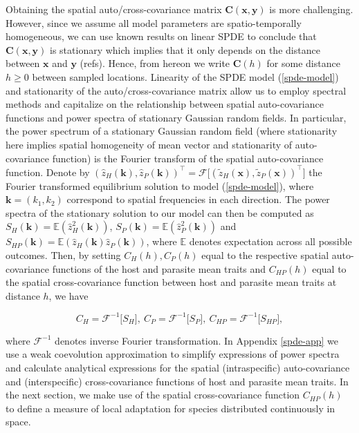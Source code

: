 \documentclass{article}
\begin{document}
Obtaining the spatial auto/cross-covariance matrix
\(\pmb C(\pmb x,\pmb y)\) is more challenging. However, since we assume
all model parameters are spatio-temporally homogeneous, we can use known
results on linear SPDE to conclude that \(\pmb C(\pmb x,\pmb y)\) is
stationary which implies that it only depends on the distance between
\(\pmb x\) and \(\pmb y\) (refs). Hence, from hereon we write
\(\pmb C(h)\) for some distance \(h\geq0\) between sampled locations.
Linearity of the SPDE model (\ref{spde-model}) and stationarity of the
auto/cross-covariance matrix allow us to employ spectral methods and
capitalize on the relationship between spatial auto-covariance functions
and power spectra of stationary Gaussian random fields. In particular,
the power spectrum of a stationary Gaussian random field (where
stationarity here implies spatial homogeneity of mean vector and
stationarity of auto-covariance function) is the Fourier transform of
the spatial auto-covariance function. Denote by
\((\hat z_H(\pmb k),\hat z_P(\pmb k))^\top=\mathcal F\big[(\tilde z_H(\pmb x),\tilde z_P(\pmb x))^\top\big]\)
the Fourier transformed equilibrium solution to model
(\ref{spde-model}), where \(\pmb k=(k_1,k_2)\) correspond to spatial
frequencies in each direction. The power spectra of the stationary
solution to our model can then be computed as
\(S_H(\pmb k)=\mathbb E(\hat z_H^2(\pmb k))\),
\(S_P(\pmb k)=\mathbb E(\hat z_P^2(\pmb k))\) and
\(S_{HP}(\pmb k)=\mathbb E(\hat z_H(\pmb k)\hat z_P(\pmb k))\), where
\(\mathbb E\) denotes expectation across all possible outcomes. Then, by
setting \(C_H(h), C_P(h)\) equal to the respective spatial
auto-covariance functions of the host and parasite mean traits and
\(C_{HP}(h)\) equal to the spatial cross-covariance function between
host and parasite mean traits at distance \(h\), we have

\begin{equation}
  C_H = \mathcal F^{-1}\big[S_H\big], \ C_P = \mathcal F^{-1}\big[S_P\big], \ C_{HP}=\mathcal F^{-1}\big[S_{HP}],
\end{equation}

where \(\mathcal F^{-1}\) denotes inverse Fourier transformation. In
Appendix \ref{spde-app} we use a weak coevolution approximation to
simplify expressions of power spectra and calculate analytical
expressions for the spatial (intraspecific) auto-covariance and
(interspecific) cross-covariance functions of host and parasite mean
traits. In the next section, we make use of the spatial cross-covariance
function \(C_{HP}(h)\) to define a measure of local adaptation for
species distributed continuously in space.
\end{document}

